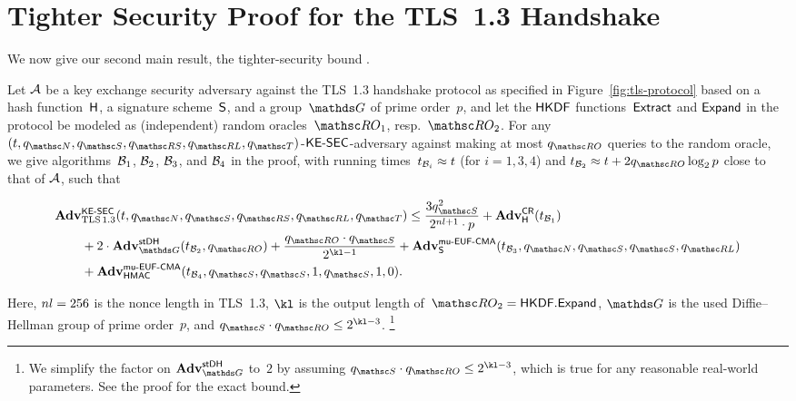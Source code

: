 \section{Tighter Security Proof for the TLS~1.3 Handshake}
\label{sec:tls-proof}

We now give our second main result, the tighter-security bound .

\begin{theorem}
	\label{thm:tls}
	Let $\mathcal{A}$ be a key exchange security adversary against the TLS~1.3 handshake protocol as specified in Figure~\ref{fig:tls-protocol} based on a hash function~$\mathsf{H}$, a signature scheme~$\mathsf{S}$, and a group~$\group$ of prime order~$p$,
	and let the $\mathsf{HKDF}$ functions~$\mathsf{Extract}$ and $\mathsf{Expand}$ in the protocol be modeled as (independent) random oracles~$\RO_1$, resp.~$\RO_2$. 
	For any $(t, \qNewUser, \qSend, \qRevSessionKey, \qRevLongTermKey, \qTest)$-$\mathsf{KE{\text{\normalfont-}}SEC}$-adversary against \SIGMAI making at most $\qRO$ queries to the random oracle,
	we give algorithms~$\mathcal{B}_1$, $\mathcal{B}_2$, $\mathcal{B}_3$, and $\mathcal{B}_4$ in the proof,
	with running times~$t_{\mathcal{B}_i} \approx t$ (for $i = 1,3,4$) and $t_{\advB_2} \approx t + 2\qRO \log_2 p$ close to that of $\mathcal{A}$, such that
	\begin{collectinmacro}{\TLSBound}{}{} %
	\begin{align*}
		\Adv&^{\KESEC}_{\mTLS}(t, \qNewUser,\qSend, \qRevSessionKey,\qRevLongTermKey,\qTest)
			\leq
			\frac{3\qSend^2}{2^{\nl+1}\cdot p} %
			+ \Adv^{\COLL}_{\Hash}(t_{\advB_1})\\ %
			&+  2 \cdot \Adv^{\strongDH}_{\group}(t_{\advB_2},\qRO)
			+\frac{\qRO\cdot \qSend}{2^{\kl-1}}
			+ \Adv^{\muEUFCMA}_{\SIGScheme}(t_{\advB_3},\qNewUser,\qSend,\qSend,\qRevLongTermKey)\\
			&+ \Adv^{\muEUFCMA}_{\HMAC}(t_{\advB_4}, \qSend,\qSend,1, \qSend,1,0).
	\end{align*}
	\end{collectinmacro}
	\TLSBound
	Here,
	$nl = 256$ is the nonce length in TLS~1.3,
	$\kl$ is the output length of~$\RO_2 = \HKDF.\Expand$,
	$\group$ is the used Diffie--Hellman group of prime order~$p$,
	and $\qSend \cdot \qRO \leq 2^{\kl-3}$.%
	\footnote{We simplify the factor on $\Adv^{\strongDH}_{\group}$ to~$2$ by assuming $\qSend \cdot \qRO \leq 2^{\kl-3}$, which is true for any reasonable real-world parameters.
	See the proof for the exact bound.}
\end{theorem}

